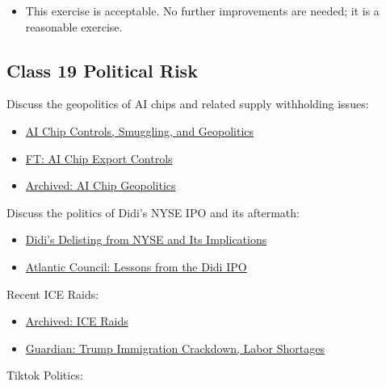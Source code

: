 \documentclass[
  11pt,
]{article}
\providecommand{\tightlist}{%
  \setlength{\itemsep}{0pt}\setlength{\parskip}{0pt}}
\begin{document}
\begin{itemize}
\tightlist
\item
  This exercise is acceptable. No further improvements are needed; it is
  a reasonable exercise.
\end{itemize}

\subsection{Class 19 Political Risk}\label{class-19-political-risk}

Discuss the geopolitics of AI chips and related supply withholding
issues:

\begin{itemize}
\tightlist
\item
  \href{https://www.eetimes.com/ai-chip-controls-smuggling-and-geopolitics/}{AI
  Chip Controls, Smuggling, and Geopolitics}
\item
  \href{https://www.ft.com/content/a13ba438-3b43-46dd-b332-4b81b3644da0}{FT:
  AI Chip Export Controls}
\item
  \href{https://archive.ph/jcX8b\#selection-1999.6-2003.36}{Archived: AI
  Chip Geopolitics}
\end{itemize}

Discuss the politics of Didi's NYSE IPO and its aftermath:

\begin{itemize}
\tightlist
\item
  \href{https://www.europeanguanxi.com/post/didi-s-delisting-from-nyse-and-its-implications-explained}{Didi's
  Delisting from NYSE and Its Implications}
\item
  \href{https://www.atlanticcouncil.org/content-series/inflection-points/lessons-from-the-didi-ipo-ride-xi-faces-a-tradeoff-between-economic-dynamism-and-authoritarian-grip/}{Atlantic
  Council: Lessons from the Didi IPO}
\end{itemize}

Recent ICE Raids:

\begin{itemize}
\tightlist
\item
  \href{https://archive.ph/pp4xl}{Archived: ICE Raids}
\item
  \href{https://www.theguardian.com/us-news/2025/jul/29/trump-immigration-crackdown-labor-shortages-slowdowns}{Guardian:
  Trump Immigration Crackdown, Labor Shortages}
\end{itemize}

Tiktok Politics:
\end{document}
